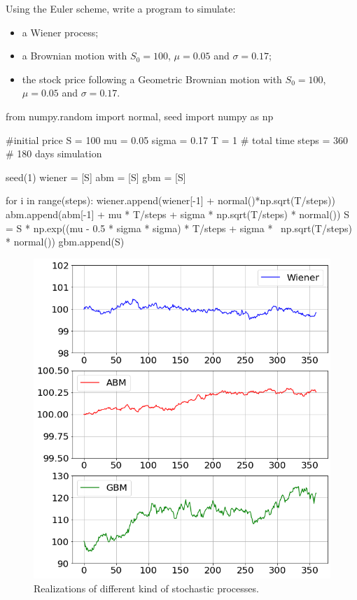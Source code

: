 \begin{question}
Using the Euler scheme, write a program to simulate:
\begin{itemize}
\item a Wiener process;
\item a Brownian motion with $S_0 = 100$, $\mu=0.05$ and $\sigma=0.17$;
\item the stock price following a Geometric Brownian motion with $S_0 = 100$, $\mu=0.05$ and $\sigma=0.17$.
\end{itemize}
\end{question}

\cprotEnv\begin{solution}
\begin{ipython}
from numpy.random import normal, seed
import numpy as np

#initial price
S = 100
mu = 0.05
sigma = 0.17
T = 1 # total time
steps = 360 # 180 days simulation

seed(1)
wiener = [S]
abm = [S]
gbm = [S]

for i in range(steps):
    wiener.append(wiener[-1] + normal()*np.sqrt(T/steps))
    abm.append(abm[-1] + mu * T/steps + sigma * np.sqrt(T/steps) * normal())
    S = S * np.exp((mu - 0.5 * sigma * sigma) * T/steps + sigma * \
                    np.sqrt(T/steps) * normal())
    gbm.append(S)
\end{ipython}

\begin{figure}
\centering
\includegraphics[width=0.7\linewidth]{figures/ex_stochastic}
\caption{Realizations of different kind of stochastic processes.}
\end{figure}
\end{solution}